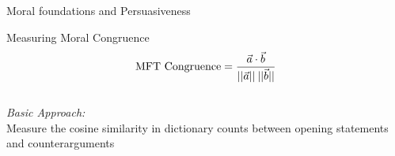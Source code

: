 \documentclass{beamer}
\begin{document}
\begin{frame}{Moral foundations and Persuasiveness}
\begin{figure}
\end{figure}
\end{frame}

\begin{frame}{Measuring Moral Congruence}\centering
\begin{equation*}
\text{MFT Congruence}=\dfrac{\vec{a}\cdot \vec{b}}{||\vec{a}||\hspace{.2em}||\vec{b}||}
\end{equation*}
\vspace{2em}\\
\large{\emph{Basic Approach:}\\Measure the cosine similarity in dictionary counts between opening statements and counterarguments}
\end{frame}
\end{document}
